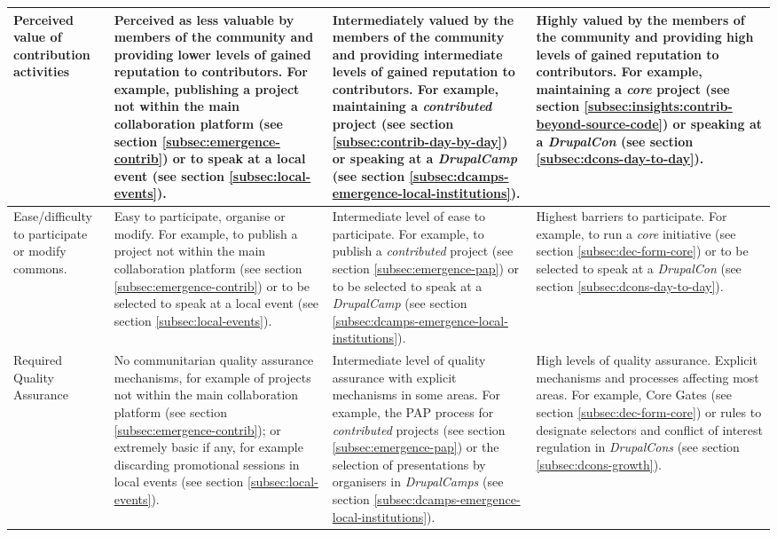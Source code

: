 \begin{footnotesize}
\begin{longtable}{|p{3cm}||p{3.4cm}|p{3.4cm}|p{3.4cm}|}
Perceived value of contribution activities  &
Perceived as less valuable by members of the community and providing lower levels of gained reputation to contributors. For example, publishing a project not within the main collaboration platform (see section \ref{subsec:emergence-contrib}) or to speak at a local event (see section \ref{subsec:local-events}). &
Intermediately valued by the members of the community and providing intermediate levels of gained reputation to contributors. For example, maintaining a \textit{contributed} project (see section \ref{subsec:contrib-day-by-day}) or speaking at a \textit{DrupalCamp} (see section \ref{subsec:dcamps-emergence-local-institutions}). &
Highly valued by the members of the community and providing high levels of gained reputation to contributors. For example, maintaining a \textit{core} project (see section \ref{subsec:insights:contrib-beyond-source-code}) or speaking at a \textit{DrupalCon} (see section \ref{subsec:dcons-day-to-day}).  \\ \hline

Ease/difficulty to participate or modify commons. &
Easy to participate, organise or modify. For example, to publish a project not within the main collaboration platform (see section \ref{subsec:emergence-contrib}) or to be selected to speak at a local event (see section \ref{subsec:local-events}). &
Intermediate level of ease to participate. For example, to publish a \textit{contributed} project (see section \ref{subsec:emergence-pap}) or to be selected to speak at a \textit{DrupalCamp} (see section \ref{subsec:dcamps-emergence-local-institutions}). &
Highest barriers to participate. For example, to run a \textit{core} initiative (see section \ref{subsec:dec-form-core}) or to be selected to speak at a \textit{DrupalCon} (see section \ref{subsec:dcons-day-to-day}).  \\ \hline

Required Quality Assurance &
No communitarian quality assurance mechanisms, for example of projects not within the main collaboration platform (see section \ref{subsec:emergence-contrib}); or extremely basic if any, for example discarding promotional sessions in local events (see section \ref{subsec:local-events}). &
Intermediate level of quality assurance with explicit mechanisms in some areas. For example, the PAP process for \textit{contributed} projects (see section \ref{subsec:emergence-pap}) or the selection of presentations by organisers in \textit{DrupalCamps} (see section \ref{subsec:dcamps-emergence-local-institutions}). &
High levels of quality assurance. Explicit mechanisms and processes affecting most areas. For example, Core Gates (see section \ref{subsec:dec-form-core}) or rules to designate selectors and conflict of interest regulation in \textit{DrupalCons} (see section \ref{subsec:dcons-growth}). \\ \hline


\end{longtable}
\end{footnotesize}
